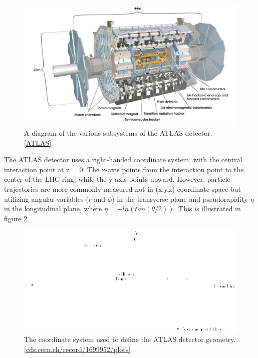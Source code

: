 \begin{figure}
  \includegraphics[width=\linewidth]{figures/detector_chapter/ATLAS.png}
  \caption{A diagram of the various subsystems of the ATLAS detector. \ref{ATLAS}}
  \label{fig:ATLAS}
\end{figure}

	The ATLAS detector uses a right-handed coordinate system, with the central interaction point at z = 0. The x-axis points from the interaction point to the center of the LHC ring, while the y-axis points upward. However, particle trajectories are more commonly measured not in (x,y,z) coordinate space but utilizing angular variables (\(r\) and \( \phi \)) in the transverse plane and pseudorapidity \( \eta \) in the longitudinal plane, where \( \eta = -ln(tan( \theta /2) ) \). This is illustrated in figure \ref{fig:coords}.

\begin{figure}
  \includegraphics[width=\linewidth]{figures/detector_chapter/coords.png}
  \caption{The coordinate system used to define the ATLAS detector geometry. \ref{cds.cern.ch/record/1699952/plots}}
  \label{fig:coords}
\end{figure}

